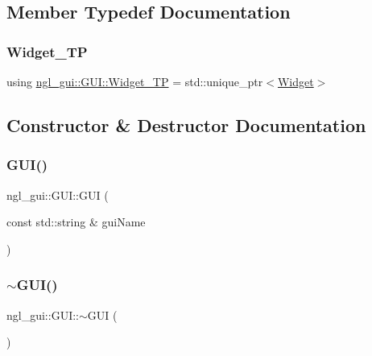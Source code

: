 \subsection{Member Typedef Documentation}
\mbox{\label{classngl__gui_1_1_g_u_i_af4d527c3697ea8524c7af82bb855286d}} 
\subsubsection{\texorpdfstring{Widget\+\_\+\+TP}{Widget\_TP}}
{\footnotesize\ttfamily using \mbox{\hyperlink{classngl__gui_1_1_g_u_i_af4d527c3697ea8524c7af82bb855286d}{ngl\+\_\+gui\+::\+G\+U\+I\+::\+Widget\+\_\+\+TP}} =  std\+::unique\+\_\+ptr$<$\mbox{\hyperlink{classngl__gui_1_1_widget}{Widget}}$>$}



\subsection{Constructor \& Destructor Documentation}
\mbox{\label{classngl__gui_1_1_g_u_i_a0b0002b02bdbf5fe660df18e104d96a8}} 
\subsubsection{\texorpdfstring{G\+U\+I()}{GUI()}}
{\footnotesize\ttfamily ngl\+\_\+gui\+::\+G\+U\+I\+::\+G\+UI (\begin{DoxyParamCaption}\item[{const std\+::string \&}]{gui\+Name }\end{DoxyParamCaption})\hspace{0.3cm}{\ttfamily [explicit]}}

\mbox{\label{classngl__gui_1_1_g_u_i_a1589c8616cbc59c64861bdbbcbb417b4}} 
\subsubsection{\texorpdfstring{$\sim$\+G\+U\+I()}{~GUI()}}
{\footnotesize\ttfamily ngl\+\_\+gui\+::\+G\+U\+I\+::$\sim$\+G\+UI (\begin{DoxyParamCaption}{ }\end{DoxyParamCaption})\hspace{0.3cm}{\ttfamily [virtual]}}



